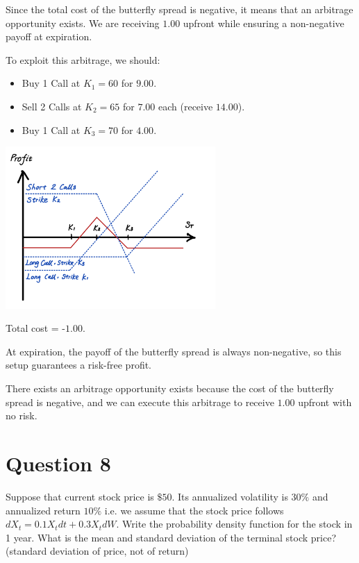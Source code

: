 \documentclass[letterpaper]{article}
\begin{document}
		Since the total cost of the butterfly spread is negative, it means that an arbitrage opportunity exists. We are receiving $1.00$ upfront while ensuring a non-negative payoff at expiration.
		
		To exploit this arbitrage, we should:
		
			\begin{itemize}
			\item Buy 1 Call at \( K_1 = 60 \) for $9.00$.
			\item Sell 2 Calls at \( K_2 = 65 \) for $7.00$ each (receive $14.00$).
			\item Buy 1 Call at \( K_3 = 70 \) for $4.00$.
		\end{itemize}
		
		\includegraphics[max width=0.6\textwidth, center]{Q7}
		
		Total cost = -$1.00$.
		
		At expiration, the payoff of the butterfly spread is always non-negative, so this setup guarantees a risk-free profit.
		
		There exists an arbitrage opportunity exists because the cost of the butterfly spread is negative, and we can execute this arbitrage to receive $1.00$ upfront with no risk.
		
		\clearpage
		\section{Question 8}

		Suppose that current stock price is $\$50$. Its annualized volatility is $30 \%$ and annualized return $10 \%$ i.e. we assume that the stock price follows ${d} {X}_{{t}}=0.1 {X}_{{t}} {dt}+0.3 {X_t} {dW}$. Write the probability density function for the stock in 1 year. What is the mean and standard deviation of the terminal stock price? (standard deviation of price, not of return)
		
\end{document}
